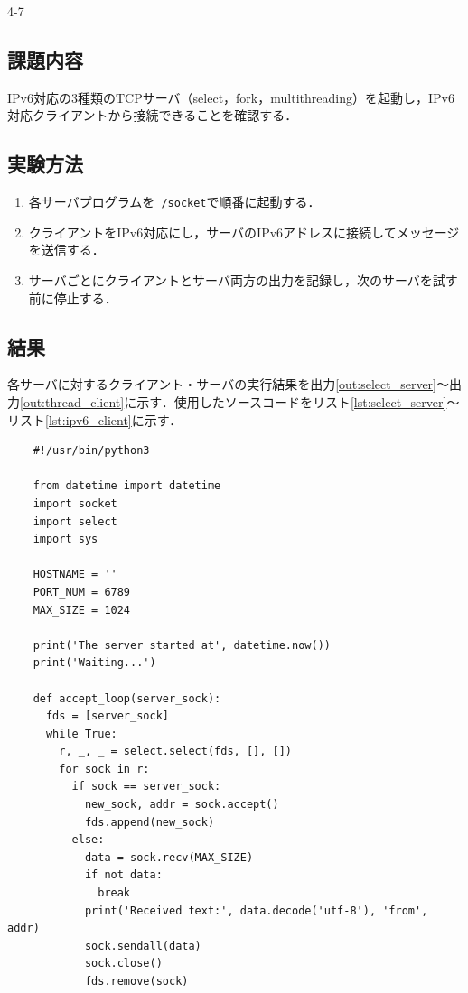 \begin{maintask}{4-7}
  \subsection*{課題内容}
  IPv6対応の3種類のTCPサーバ（select，fork，multithreading）を起動し，IPv6対応クライアントから接続できることを確認する．

  \subsection*{実験方法}
  \begin{enumerate}
    \item 各サーバプログラムを\texttt{~/socket}で順番に起動する．
    \item クライアントをIPv6対応にし，サーバのIPv6アドレスに接続してメッセージを送信する．
    \item サーバごとにクライアントとサーバ両方の出力を記録し，次のサーバを試す前に停止する．
  \end{enumerate}

  \subsection*{結果}
  各サーバに対するクライアント・サーバの実行結果を出力\ref{out:select_server}〜出力\ref{out:thread_client}に示す．使用したソースコードをリスト\ref{lst:select_server}〜リスト\ref{lst:ipv6_client}に示す．

  \begin{listing}[H]
    \caption{IPv6対応tcp\_server\_select.py}\label{lst:select_server}
    \begin{verbatim}
    #!/usr/bin/python3

    from datetime import datetime
    import socket
    import select
    import sys

    HOSTNAME = ''
    PORT_NUM = 6789
    MAX_SIZE = 1024

    print('The server started at', datetime.now())
    print('Waiting...')

    def accept_loop(server_sock):
      fds = [server_sock]
      while True:
        r, _, _ = select.select(fds, [], [])
        for sock in r:
          if sock == server_sock:
            new_sock, addr = sock.accept()
            fds.append(new_sock)
          else:
            data = sock.recv(MAX_SIZE)
            if not data:
              break
            print('Received text:', data.decode('utf-8'), 'from', addr)
            sock.sendall(data)
            sock.close()
            fds.remove(sock)


\end{verbatim}
\end{listing}
\end{maintask}
